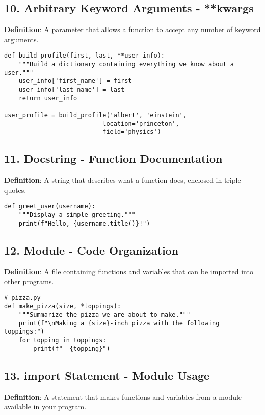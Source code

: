 \subsection*{10. Arbitrary Keyword Arguments - **kwargs}
\textbf{Definition}: A parameter that allows a function to accept any number of keyword arguments.

\begin{lstlisting}
def build_profile(first, last, **user_info):
    """Build a dictionary containing everything we know about a user."""
    user_info['first_name'] = first
    user_info['last_name'] = last
    return user_info

user_profile = build_profile('albert', 'einstein',
                           location='princeton',
                           field='physics')
\end{lstlisting}

\subsection*{11. Docstring - Function Documentation}
\textbf{Definition}: A string that describes what a function does, enclosed in triple quotes.

\begin{lstlisting}
def greet_user(username):
    """Display a simple greeting."""
    print(f"Hello, {username.title()}!")
\end{lstlisting}

\subsection*{12. Module - Code Organization}
\textbf{Definition}: A file containing functions and variables that can be imported into other programs.

\begin{lstlisting}
# pizza.py
def make_pizza(size, *toppings):
    """Summarize the pizza we are about to make."""
    print(f"\nMaking a {size}-inch pizza with the following toppings:")
    for topping in toppings:
        print(f"- {topping}")
\end{lstlisting}

\subsection*{13. import Statement - Module Usage}
\textbf{Definition}: A statement that makes functions and variables from a module available in your program.

